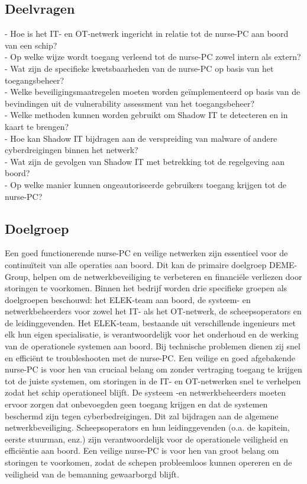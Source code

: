 \subsection{Deelvragen}
- Hoe is het IT- en OT-netwerk ingericht in relatie tot de nurse-PC aan boord van een schip? \\     
- Op welke wijze wordt toegang verleend tot de nurse-PC zowel intern als extern? \\    
- Wat zijn de specifieke kwetsbaarheden van de nurse-PC op basis van het toegangsbeheer? \\       
- Welke beveiligingsmaatregelen moeten worden geïmplementeerd op basis van de bevindingen uit de vulnerability assessment van het toegangsbeheer? \\
- Welke methoden kunnen worden gebruikt om Shadow IT te detecteren en in kaart te brengen? \\
- Hoe kan Shadow IT bijdragen aan de verspreiding van malware of andere cyberdreigingen binnen het netwerk?\\
- Wat zijn de gevolgen van Shadow IT met betrekking tot de regelgeving aan boord?\\
- Op welke manier kunnen ongeautoriseerde gebruikers toegang krijgen tot de nurse-PC?\\

\subsection{Doelgroep}
Een goed functionerende nurse-PC en veilige netwerken zijn essentieel voor de continuïteit van alle operaties aan boord. 
Dit kan de primaire doelgroep DEME-Group, helpen om de netwerkbeveiliging te verbeteren en financiële verliezen door storingen te voorkomen.
Binnen het bedrijf worden drie specifieke groepen als doelgroepen beschouwd: het ELEK-team aan boord, de systeem- en netwerkbeheerders voor zowel het IT- als het OT-netwerk, de scheepsoperators en de leidinggevenden.
Het ELEK-team, bestaande uit verschillende ingenieurs met elk hun eigen specialisatie, is verantwoordelijk voor het onderhoud en de werking van de operationele systemen aan boord. Bij technische problemen dienen zij snel en efficiënt te troubleshooten met de nurse-PC.  
Een veilige en goed afgebakende nurse-PC is voor hen van cruciaal belang om zonder vertraging toegang te krijgen tot de juiste systemen, om storingen in de IT- en OT-netwerken snel te verhelpen zodat het schip operationeel blijft.
De systeem -en netwerkbeheerders moeten ervoor zorgen dat onbevoegden geen toegang krijgen en dat de systemen beschermd zijn tegen cyberbedreigingen. Dit zal bijdragen aan de algemene netwerkbeveiliging.
Scheepsoperators en hun leidinggevenden (o.a. de kapitein, eerste stuurman, enz.) zijn verantwoordelijk voor de operationele veiligheid en efficiëntie aan boord. Een veilige nurse-PC is voor hen van groot belang om storingen te voorkomen, 
zodat de schepen probleemloos kunnen opereren en de veiligheid van de bemanning gewaarborgd blijft.

